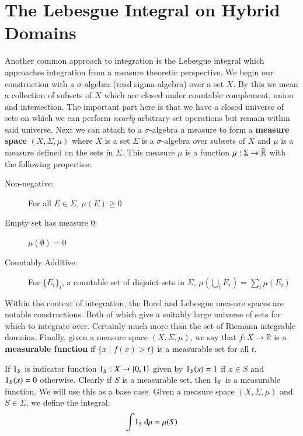 \section{The Lebesgue Integral on Hybrid Domains}

Another common approach to integration is the Lebesgue integral which approaches integration from a measure theoretic
perspective.
We begin our construction with a $\sigma$-algebra (read sigma-algebra) over a set $X$.
By this we mean a collection of subsets of $X$ which are closed under countable complement, union and intersection.
The important part here is that we have a closed universe of sets on which we can perform 
\emph{nearly} arbitrary set operations but remain within said universe.
Next we can attach to a $\sigma$-algebra a measure to form a \textbf{measure space} $(X, \Sigma, \mu)$ 
where $X$ is a set $\Sigma$ is a $\sigma$-algebra  over subsets of $X$ and $\mu$ is a measure defined on the sets in
 $\Sigma$.
This measure $\mu$ is a function $\mu: \Sigma \to \bar{\mathbb{R}}$ with the following properties:
\begin{description}
	\item[Non-negative:] For all $E \in \Sigma$, $\mu(E) \geq 0$
	\item[Empty set has measure 0:] $\mu(\emptyset) = 0$
	\item[Countably Additive:] For $\{E_i\}_i$, a countable set of disjoint sets in $\Sigma$,
		$\mu \left( \bigcup_i E_i \right) = \sum_i \mu(E_i)$
\end{description}
Within the context of integration, the Borel and Lebesgue measure spaces are notable constructions.
Both of which give a suitably large universe of sets for which to integrate over.
Certainly much more than the set of Riemann integrable domains.
Finally, given a measure space $(X, \Sigma, \mu)$, we say that $f : X \to \mathbb{R}$ is a \textbf{measurable function}
if  $\{ x \; | \; f(x) > t\}$ is a measurable set for all $t$.



If $\ind[S]$ is indicator function $\ind[S] : X \to \{ 0, 1 \}$ given by 
$\ind[S] (x) = 1$ if $x \in S$ and $\ind[S] (x) = 0$ otherwise.
Clearly if $S$ is a measurable set, then $\ind[S]$ is a measurable function.
We will use this as a base case.
Given a measure space $(X, \Sigma, \mu)$ and $S \in \Sigma$, we define the integral:
\begin{equation*}
	\int \! \ind[S] \diff \mu = \mu ( S )
\end{equation*}


